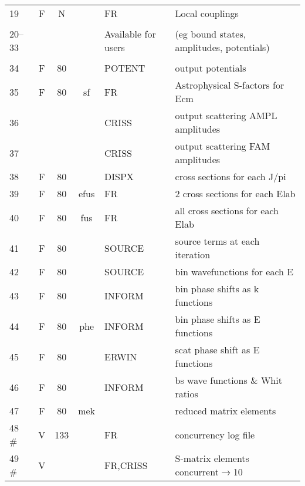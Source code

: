 \documentclass[11pt]{article}
\begin{document}
{\begin{tabular}{|l | c c c | l | l|}
19    &  F &    N      &    &     FR  &   Local couplings\\
     &  & & & &\\
20--33&    &            &    &     Available for users & (eg bound states, amplitudes, potentials)\\
     &  & & & &\\
34    &  F &    80      &    &     POTENT &   output potentials\\
35    &  F &    80      & sf  &     FR & Astrophysical S-factors for Ecm\\
36    &    &            &    &     CRISS & output scattering AMPL amplitudes\\
37    &    &            &    &     CRISS & output scattering FAM amplitudes\\
38    &  F &    80      &    &     DISPX &    cross sections for each J/pi\\
39    &  F &    80      & efus  &      FR   &    2 cross sections for each Elab\\
40    &  F &    80      & fus  &      FR   &    all cross sections for each Elab\\
41    &  F &    80      &    &     SOURCE &   source terms at each iteration\\
42    &  F &    80      &    &     SOURCE &   bin wavefunctions for each E\\
43    &  F &    80      &    &     INFORM &   bin phase shifts as k functions\\
44    &  F &    80      & phe  &     INFORM &   bin phase shifts as E functions\\
45    &  F &    80      &    &     ERWIN   &  scat phase shift as E functions\\
46    &  F &    80      &    &     INFORM &   bs wave functions \& Whit ratios\\
47    &  F &    80      &   mek &           &   reduced matrix elements \\
48  \#  & V &   133      &    &       FR  & concurrency log file\\
49  \#  & V &        &    &     FR,CRISS & S-matrix elements concurrent$\rightarrow$10\\
\hline
\end{tabular}

}
\end{document}
